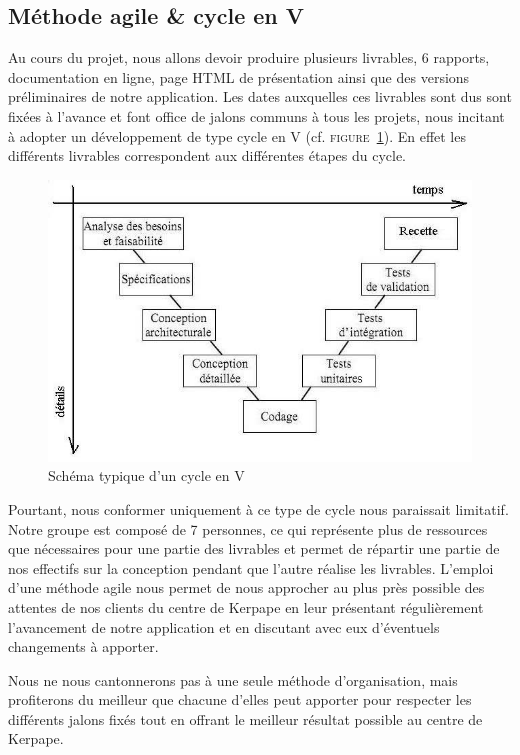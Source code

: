 \subsection{Méthode agile \& cycle en V}
Au cours du projet, nous allons devoir produire plusieurs livrables, 6 rapports, documentation en ligne, page HTML de présentation ainsi que des versions préliminaires de notre application. Les dates auxquelles ces livrables sont dus sont fixées à l'avance et font office de jalons communs à tous les projets, nous incitant à adopter un développement de type cycle en V (cf. \textsc{figure~\ref{cycle_v}}). En effet les différents livrables correspondent aux différentes étapes du cycle. 
\begin{figure}[h]
  \centering
  \includegraphics[width=\linewidth]{3-Planification/img-utilisateur/cycle_v}
  \caption{Schéma typique d'un cycle en V}
  \label{cycle_v}
\end{figure}

Pourtant, nous conformer uniquement à ce type de cycle nous paraissait limitatif. Notre groupe est composé de 7 personnes, ce qui représente plus de ressources que nécessaires pour une partie des livrables et permet de répartir une partie de nos effectifs sur la conception pendant que l'autre réalise les livrables. L'emploi d'une méthode agile nous permet de nous approcher au plus près possible des attentes de nos clients du centre de Kerpape en leur présentant régulièrement l'avancement de notre application et en discutant avec eux d'éventuels changements à apporter.\newline

Nous ne nous cantonnerons pas à une seule méthode d'organisation, mais profiterons du meilleur que chacune d'elles peut apporter pour respecter les différents jalons fixés tout en offrant le meilleur résultat possible au centre de Kerpape. 

